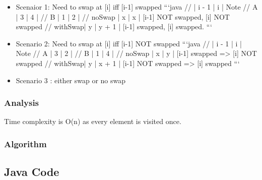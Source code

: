 \documentclass[]{book}
\begin{document}
\begin{itemize}
    \item  Scenaior 1: Need to swap at [i] iff [i-1] swapped
        ```java
        //         | i - 1 | i     | Note
        // A       | 3     | 4     |
        // B       | 1     | 2     |
        // noSwap  | x     | x     | [i-1] NOT swapped, [i] NOT swapped
        // withSwap| y     | y + 1 | [i-1] swapped, [i] swapped.
        ```
    \item Scenario 2: Need to swap at [i] iff [i-1] NOT swapped
        ```java
        //         | i - 1 | i     | Note
        // A       | 3     | 2     |
        // B       | 1     | 4     |
        // noSwap  | x     | y     | [i-1] swapped => [i] NOT swapped
        // withSwap| y     | x + 1 | [i-1] NOT swapped => [i] swapped
        ```
    \item Scenario 3 : either swap or no swap
\end{itemize}

\hypertarget{analysis-38}{%
\subsubsection{Analysis}\label{analysis-38}}

Time complexity is O(n) as every element is visited once.

\hypertarget{algorithm-38}{%
\subsubsection{Algorithm}\label{algorithm-38}}

\hypertarget{java-code-32}{%
\subsection{Java Code}\label{java-code-32}}
\end{document}
